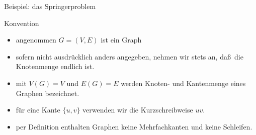 \documentclass[aspectratio=1610, 11pt]{beamer}
\begin{document}
\begin{frame}
\begin{overprint}
\begin{exampleblock}{Beispiel: das Springerproblem}
\begin{itemize}
		\end{itemize}
	\end{exampleblock}
		\begin{exampleblock}{Konvention}
		\begin{itemize}
			\item angenommen $G=(V,E)$ ist ein Graph
			\item sofern nicht ausdr\"ucklich anders angegeben, nehmen wir stets an, da\ss\ die Knotenmenge endlich ist.
			\item mit $V(G)=V$ und $E(G)=E$ werden Knoten- und Kantenmenge eines Graphen bezeichnet.
			\item f\"ur eine Kante $\{u,v\}$ verwenden wir die Kurzschreibweise $uv$.
			\item per Definition enthalten Graphen keine \alert{Mehrfachkanten} und keine \alert{Schleifen}.
		\end{itemize}
	\end{exampleblock}
	\end{overprint}
\end{frame}
\end{document}
